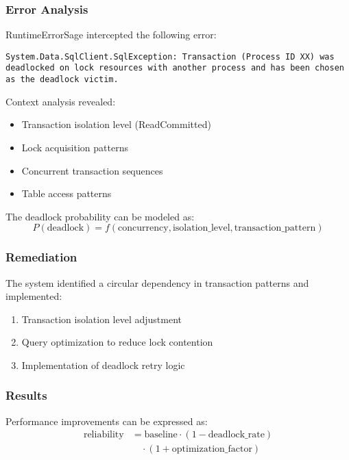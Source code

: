 \subsubsection{Error Analysis}
RuntimeErrorSage intercepted the following error:
\begin{lstlisting}[style=csharpstyle,caption={Database Deadlock Error}]
System.Data.SqlClient.SqlException: Transaction (Process ID XX) was deadlocked on lock resources with another process and has been chosen as the deadlock victim.
\end{lstlisting}

Context analysis revealed:
\begin{itemize}
    \item Transaction isolation level (ReadCommitted)
    \item Lock acquisition patterns
    \item Concurrent transaction sequences
    \item Table access patterns
\end{itemize}

The deadlock probability can be modeled as:
\begin{equation}
P(\text{deadlock}) = f(\text{concurrency}, \text{isolation\_level}, \text{transaction\_pattern})
\end{equation}

\subsubsection{Remediation}
The system identified a circular dependency in transaction patterns and implemented:
\begin{enumerate}
    \item Transaction isolation level adjustment
    \item Query optimization to reduce lock contention
    \item Implementation of deadlock retry logic
\end{enumerate}

\subsubsection{Results}
Performance improvements can be expressed as:
\begin{equation}
\begin{split}
\text{reliability} &= \text{baseline} \cdot (1 - \text{deadlock\_rate}) \\
&\quad \cdot (1 + \text{optimization\_factor})
\end{split}
\end{equation}


